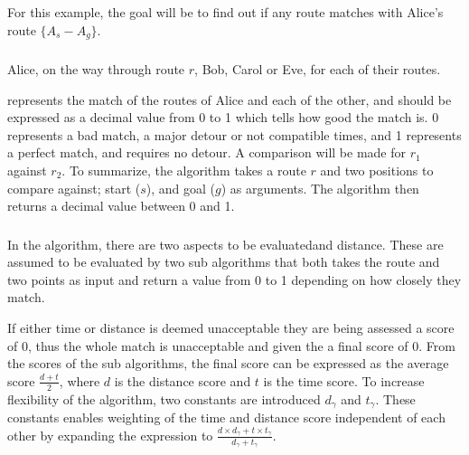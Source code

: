 For this example, the goal will be to find out if any route matches with Alice's route $\{A_s-A_g\}$.

\subsubsection{}
\addtocounter{subsubsection}{-1}%
\DIFdelend \DIFaddbegin {}\DIFaddend Alice, on the way through route $r$, \DIFdelbegin {}\DIFdelend \DIFaddbegin {}\DIFaddend Bob, Carol or Eve, for each of their routes.

\DIFdelbegin {}\DIFdelend \DIFaddbegin 

\DIFaddend represents the match of the routes of Alice and each of the other, and should be expressed as a decimal value from 0 to 1 which tells how good the match is.
0 represents a bad match, a major detour or not compatible times, and 1 represents a perfect match, and requires no detour.
A comparison will be made for $r_1$ against $r_2$.
To summarize, the algorithm takes a route $r$ and two positions to compare against; start ($s$), and goal ($g$) as arguments.
The algorithm then returns a decimal value between 0 and 1.

\DIFaddbegin \subsubsection{}

\DIFaddend In the algorithm, there are two aspects to be evaluated\DIFdelbegin {}\DIFdelend \DIFaddbegin {}\DIFaddend and distance.
These are assumed to be evaluated by two sub algorithms that both takes the route and two points as input and return a value from 0 to 1 depending on how closely they match.

If either time or distance is deemed unacceptable they are being assessed a score of 0, thus the whole match is unacceptable and given the a final score of 0.
From the scores of the sub algorithms, the final score can be expressed as the average score $\frac{d+t}{2}$, where $d$ is the distance score and $t$ is the time score.
To increase flexibility of the algorithm, two constants are introduced $d_\gamma$ and $t_\gamma$.
These constants enables weighting of the time and distance score independent of each other by expanding the expression to $\frac{d\times d_\gamma+t\times t_\gamma}{d_\gamma+t_\gamma}$.

